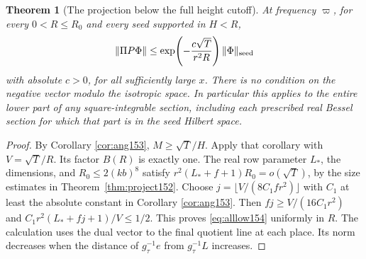 \documentclass[a4paper,11pt]{article}
\newtheorem{theorem}[proposition]{Theorem}
\theoremstyle{definition}
\theoremstyle{remark}
\numberwithin{equation}{section}
\begin{document}
\begin{theorem}[The projection below the full height cutoff]
\label{thm:alllow154}
At frequency \(\varpi\), for every \(0<R\le R_0\) and every
seed supported in \(H<R\),
\begin{equation}
        \|\Pi P\Phi\|\le
          \exp\!\left(-\frac{c\sqrt T}{r^2R}\right)\|\Phi\|_{\rm seed}
         \label{eq:alllow154}
\end{equation}
with absolute \(c>0\), for all sufficiently large \(x\).
There is no condition on the negative vector modulo the
isotropic space. In particular this applies to the entire
lower part of any square-integrable section, including each
prescribed real Bessel section for which that part is in the
seed Hilbert space.
\end{theorem}
\begin{proof}
By Corollary \ref{cor:ang153},
\(M\ge\sqrt T/H\). Apply that corollary with
\(V=\sqrt T/R\). Its factor \(B(R)\) is exactly one.
The real row parameter \(L_*\), the dimensions, and
\(R_0\le2(kb)^8\) satisfy
\(r^2(L_*+f+1)R_0=o(\sqrt T)\), by the size estimates in
Theorem~\ref{thm:project152}. Choose
\(j=\lfloor V/(8C_1 f r^2)\rfloor\) with \(C_1\) at least
the absolute constant in Corollary \ref{cor:ang153}.
Then \(fj\ge V/(16C_1 r^2)\) and
\(C_1r^2(L_*+fj+1)/V\le1/2\). This proves
\eqref{eq:alllow154} uniformly in \(R\). The calculation uses
the dual vector to the final quotient line at each place.
Its norm decreases when the distance of \(g_\tau^{-1}e\)
from \(g_\tau^{-1}L\) increases.
\end{proof}
\end{document}
